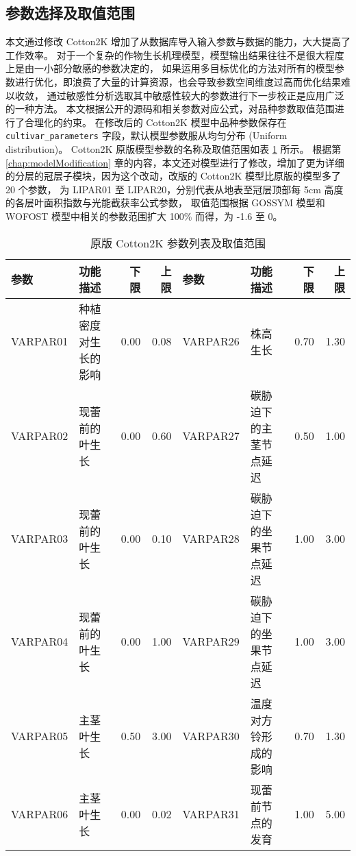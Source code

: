 \begin{spacing}{}
    \section{参数选择及取值范围}
    本文通过修改 Cotton2K 增加了从数据库导入输入参数与数据的能力，大大提高了工作效率。%
    对于一个复杂的作物生长机理模型，模型输出结果往往不是很大程度上是由一小部分敏感的参数决定的，%
    如果运用多目标优化的方法对所有的模型参数进行优化，即浪费了大量的计算资源，也会导致参数空间维度过高而优化结果难以收敛，%
    通过敏感性分析选取其中敏感性较大的参数进行下一步校正是应用广泛的一种方法。%
    本文根据公开的源码和相关参数对应公式，对品种参数取值范围进行了合理化的约束。%
    在修改后的 Cotton2K 模型中品种参数保存在 \texttt{cultivar\_parameters} 字段，默认模型参数服从均匀分布 (Uniform distribution)。%
    Cotton2K 原版模型参数的名称及取值范围如表 \ref{tab:saParameters} 所示。%
    根据第 \ref{chap:modelModification} 章的内容，本文还对模型进行了修改，增加了更为详细的分层的冠层子模块，因为这个改动，改版的 Cotton2K 模型比原版的模型多了 20 个参数，%
    为 LIPAR01 至 LIPAR20，分别代表从地表至冠层顶部每 5cm 高度的各层叶面积指数与光能截获率公式参数，%
    取值范围根据 GOSSYM 模型和 WOFOST 模型中相关的参数范围扩大 100\% 而得，为 -1.6 至 0。
    \begin{table}
        \caption{原版 Cotton2K 参数列表及取值范围}\label{tab:saParameters}
        \small
        \begin{tabular}{llrr|llrr}
            \toprule
            参数     & 功能描述             & 下限  & 上限  & 参数     & 功能描述                   & 下限   & 上限   \\
            \midrule
            VARPAR01 & 种植密度对生长的影响 & 0.00  & 0.08  & VARPAR26 & 株高生长                   & 0.70   & 1.30   \\
            VARPAR02 & 现蕾前的叶生长       & 0.00  & 0.60  & VARPAR27 & 碳胁迫下的主茎节点延迟     & 0.50   & 1.00   \\
            VARPAR03 & 现蕾前的叶生长       & 0.00  & 0.10  & VARPAR28 & 碳胁迫下的坐果节点延迟     & 1.00   & 3.00   \\
            VARPAR04 & 现蕾前的叶生长       & 0.00  & 1.00  & VARPAR29 & 碳胁迫下的坐果节点延迟     & 1.00   & 3.00   \\
            VARPAR05 & 主茎叶生长           & 0.50  & 3.00  & VARPAR30 & 温度对方铃形成的影响       & 0.70   & 1.30   \\
            VARPAR06 & 主茎叶生长           & 0.00  & 0.02  & VARPAR31 & 现蕾前节点的发育           & 1.00   & 5.00   \\

\end{tabular}
\end{table}
\end{spacing}
